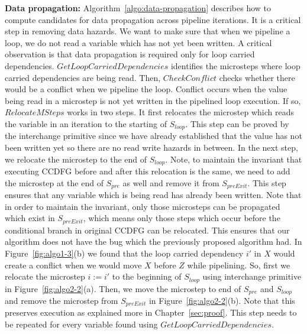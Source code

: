 {\bf Data propagation:} Algorithm~\ref{algo:data-propagation} describes how to compute candidates for data
propagation across pipeline iterations. It is a critical step in removing data hazards. We want to make sure that when we pipeline a loop, we do not read a variable which has not
yet been written. A critical observation is that data propagation is required only for loop carried dependencies.
$GetLoopCarriedDependencies$ identifies the microsteps where loop carried dependencies are being read. Then,
$CheckConflict$ checks whether there would be a conflict when we pipeline the loop.
Conflict occurs when the value being read in a microstep is not yet written in the pipelined loop execution. If so, $RelocateMSteps$ works in two steps. It first relocates the microstep which reads the variable in an iteration to the starting of $S_{loop}$. This step can be proved by the interchange primitive since we have already established that the value has not been written yet so there are no read write hazards in between. In the next step, we relocate the microstep to the end of $S_{loop}$. Note, to maintain the invariant that executing CCDFG before and after this relocation is the same, we need to add the microstep at the end of $S_{pre}$ as well and remove it from $S_{preExit}$. This step ensures that any variable which is being read has already been written. Note that in order to maintain the invariant, only those microsteps can be propagated which exist in $S_{preExit}$, which means only those steps which occur before the conditional branch in original CCDFG can be relocated. This ensures that our algorithm does not have the bug which the previously proposed algorithm had.
In Figure~\ref{fig:algo1-3}(b) we found that the loop carried dependency $i'$ in $X$ would create a conflict when we would move $X$ before $Z$ while pipelining. So, first we relocate the microstep $i := i'$ to the beginning of $S_{loop}$ using interchange primitive in Figure~\ref{fig:algo2-2}(a). Then, we move the microstep to end of $S_{pre}$ and $S_{loop}$ and remove the microstep from $S_{preExit}$ in  Figure~\ref{fig:algo2-2}(b). Note that this preserves execution as explained more in Chapter~\ref{sec:proof}. 
This step needs to be repeated for every variable found using $GetLoopCarriedDependencies$.

